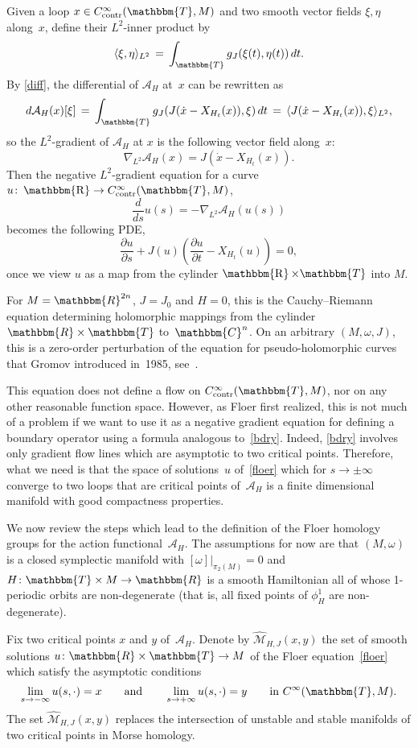 \documentclass[12pt,twoside]{amsart}
\theoremstyle{plain}
\numberwithin{figure}{section}
\numberwithin{equation}{section}
\def\ca{{\mathcal A}}
\def\cm{{\mathcal M}}
\def\CC{\mathbbm{C}}
\def\RR{\mathbbm{R}}
\def\TT{\mathbbm{T}}
\def\R{\operatorname{\mathbbm{R}}}
\begin{document}
Given a loop $x \in C^{\infty}_{\rm contr}(\TT,M)$ and two smooth vector fields $\xi, \eta$ along~$x$,
define their $L^2$-inner product by
\[
\langle \xi, \eta \rangle_{L^2} \,=\, \int_{\TT} g_J (\xi(t), \eta(t)) \,dt. 
\]
By \eqref{diff}, the differential of $\ca_H$ at~$x$ can be rewritten as
\[
d\ca_H(x)[\xi] \,=\, \int_{\TT} g_J(J(\dot{x} - X_{H_t}(x)),\xi)\, dt \,=\, \langle J(\dot{x} - X_{H_t}(x)),\xi \rangle_{L^2},
\]
so the $L^2$-gradient of $\ca_H$ at $x$ is the following vector field along~$x$:
\[
\nabla_{L^2} \ca_H(x) = J(\dot{x} - X_{H_t}(x)).
\]
Then the negative $L^2$-gradient equation for a curve $u \colon \R \to C^{\infty}_{\rm contr}(\TT,M)$,
\[
\frac{d}{ds} u(s) = - \nabla_{L^2} \ca_H(u(s))
\]
becomes the following PDE, 
\begin{equation}
\label{floer}
\frac{\partial u}{\partial s} + J(u) \left( \frac{\partial u}{\partial t} - X_{H_t}(u) \right) = 0,
\end{equation}
once we view $u$ as a map from the cylinder $\R \times \TT$ into $M$.

For $M=\RR^{2n}$, $J = J_0$ and $H=0$, this is the Cauchy--Riemann equation 
determining holomorphic mappings from the cylinder $\RR \times \TT$ to~$\CC^n$. 
On an arbitrary $(M,\omega,J)$, this is a zero-order perturbation of the equation for pseudo-holomorphic curves that Gromov introduced in~1985, see~\cite{Gro85}. 

This equation does not define a flow on $C^{\infty}_{\rm contr}(\TT,M)$, 
nor on any other reasonable function space. However, as Floer first realized,
this is not much of a problem if we want to use it as a negative gradient equation for defining a boundary operator using a formula analogous to~\eqref{bdry}. Indeed, \eqref{bdry} involves only gradient flow lines which are asymptotic to two critical points. Therefore, what we need is that the space of solutions~$u$ 
of~\eqref{floer} which for $s \rightarrow \pm \infty$ converge to two loops that are critical points 
of~$\ca_H$ is a finite dimensional manifold with good compactness properties.

We now review the steps which lead to the definition of the Floer homology groups for the action 
functional~$\ca_H$. The assumptions for now are that $(M,\omega)$ is a closed symplectic manifold 
with $[\omega]|_{\pi_2(M)}=0$ and $H \colon \TT \times M \rightarrow \RR$ is a smooth Hamiltonian all of whose 1-periodic orbits are non-degenerate 
(that is, all fixed points of $\phi^1_H$ are non-degenerate).

Fix two critical points $x$ and $y$ of~$\ca_H$. Denote by $\widehat{\cm}_{H,J}(x,y)$ the set of smooth solutions $u \colon \RR \times \TT \to M$ of the Floer equation~\eqref{floer} which satisfy the 
asymptotic conditions
\[
\lim_{s\rightarrow -\infty} u(s,\cdot) = x \qquad \mbox{and} \qquad \lim_{s\rightarrow +\infty} u(s,\cdot) = y \qquad \mbox{in } C^{\infty}(\TT,M).
\]
The set $\widehat{\cm}_{H,J}(x,y)$ replaces the intersection of unstable and stable manifolds of two critical points in Morse homology. 
\end{document}
